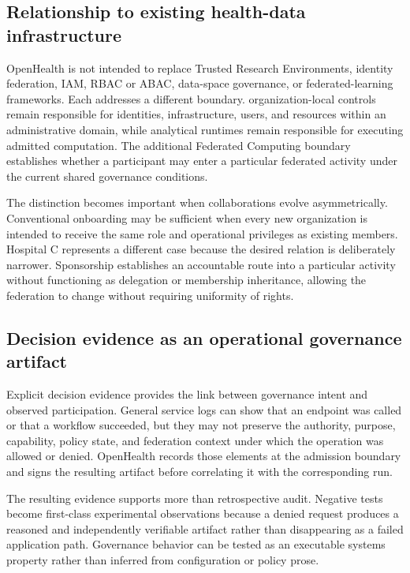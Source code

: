 \documentclass[twoside,11pt]{article}
\begin{document}
\subsection{Relationship to existing health-data infrastructure}

OpenHealth is not intended to replace Trusted Research Environments, identity federation, IAM, RBAC or ABAC, data-space governance, or federated-learning frameworks. Each addresses a different boundary. organization-local controls remain responsible for identities, infrastructure, users, and resources within an administrative domain, while analytical runtimes remain responsible for executing admitted computation. The additional Federated Computing boundary establishes whether a participant may enter a particular federated activity under the current shared governance conditions.

The distinction becomes important when collaborations evolve asymmetrically. Conventional onboarding may be sufficient when every new organization is intended to receive the same role and operational privileges as existing members. Hospital C represents a different case because the desired relation is deliberately narrower. Sponsorship establishes an accountable route into a particular activity without functioning as delegation or membership inheritance, allowing the federation to change without requiring uniformity of rights.

\subsection{Decision evidence as an operational governance artifact}

Explicit decision evidence provides the link between governance intent and observed participation. General service logs can show that an endpoint was called or that a workflow succeeded, but they may not preserve the authority, purpose, capability, policy state, and federation context under which the operation was allowed or denied. OpenHealth records those elements at the admission boundary and signs the resulting artifact before correlating it with the corresponding run.

The resulting evidence supports more than retrospective audit. Negative tests become first-class experimental observations because a denied request produces a reasoned and independently verifiable artifact rather than disappearing as a failed application path. Governance behavior can  be tested as an executable systems property rather than inferred from configuration or policy prose.
\end{document}
